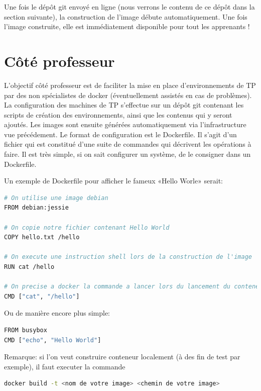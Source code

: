 \documentclass[a4paper,11pt]{report}
\begin{document}
Une fois le dépôt git envoyé en ligne (nous verrons le contenu de ce dépôt dans la section suivante), la construction de l'image débute automatiquement. Une fois l'image construite, elle est immédiatement disponible pour tout les apprenants !

\section{Côté professeur}

L'objectif côté professeur est de faciliter la mise en place d'environnements de TP par des non spécialistes de docker (éventuellement assistés en cas de problèmes).
La configuration des machines de TP s'effectue sur un dépôt git contenant les scripts de création des environnements, ainsi que les contenus qui y seront ajoutés. Les images sont ensuite générées automatiquement via l'infrastructure vue précédement.
Le format de configuration est le Dockerfile. Il s'agit d'un fichier qui est constitué d'une suite de commandes qui décrivent les opérations à faire. Il est très simple, si on sait configurer un système, de le consigner dans un Dockerfile.

Un exemple de Dockerfile pour afficher le fameux «Hello Worle» serait:

\begin{lstlisting}[language=Bash,caption={Dockerfile Hello World}]
# On utilise une image debian
FROM debian:jessie

# On copie notre fichier contenant Hello World
COPY hello.txt /hello

# On execute une instruction shell lors de la construction de l'image
RUN cat /hello

# On precise a docker la commande a lancer lors du lancement du conteneur
CMD ["cat", "/hello"]
\end{lstlisting}

Ou de manière encore plus simple:

\begin{lstlisting}[language=Bash,caption={Dockerfile Hello World simplifié}]
FROM busybox
CMD ["echo", "Hello World"]
\end{lstlisting}

Remarque: si l'on veut construire conteneur localement (à des fin de test par exemple), il faut executer la commande 
\begin{lstlisting}[language=Bash,caption={Construire une image docker}]
docker build -t <nom de votre image> <chemin de votre image>
\end{lstlisting}
\end{document}
